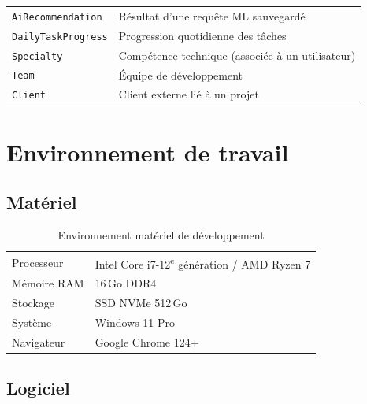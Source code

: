 \begin{table}[H]
\begin{tabularx}{\textwidth}{L{4cm}X}
    \texttt{AiRecommendation}   & Résultat d'une requête ML sauvegardé \\
    \texttt{DailyTaskProgress}  & Progression quotidienne des tâches \\
    \texttt{Specialty}          & Compétence technique (associée à un utilisateur) \\
    \texttt{Team}               & Équipe de développement \\
    \texttt{Client}             & Client externe lié à un projet \\
    \bottomrule
  \end{tabularx}
\end{table}

\section{Environnement de travail}

\subsection{Matériel}

\begin{table}[H]
  \centering
  \caption{Environnement matériel de développement}
  \label{tab:env_materiel}
  \begin{tabularx}{\textwidth}{L{3.5cm}X}
    \toprule
     &  \\
    \midrule
    Processeur     & Intel Core i7-12\textsuperscript{e} génération / AMD Ryzen 7 \\
    Mémoire RAM    & 16\,Go DDR4 \\
    Stockage       & SSD NVMe 512\,Go \\
    Système        & Windows 11 Pro \\
    Navigateur     & Google Chrome 124+ \\
    \bottomrule
  \end{tabularx}
\end{table}

\subsection{Logiciel}

